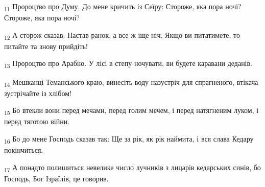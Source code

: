 \begin{tcolorbox}
\textsubscript{11} Пророцтво про Думу. До мене кричить із Сеїру: Стороже, яка пора ночі? Стороже, яка пора ночі?
\end{tcolorbox}
\begin{tcolorbox}
\textsubscript{12} А сторож сказав: Настав ранок, а все ж іще ніч. Якщо ви питатимете, то питайте та знову прийдіть!
\end{tcolorbox}
\begin{tcolorbox}
\textsubscript{13} Пророцтво про Арабію. У лісі в степу ночувати, ви будете каравани деданів.
\end{tcolorbox}
\begin{tcolorbox}
\textsubscript{14} Мешканці Теманського краю, винесіть воду назустріч для спрагненого, втікача зустрічайте із хлібом!
\end{tcolorbox}
\begin{tcolorbox}
\textsubscript{15} Бо втекли вони перед мечами, перед голим мечем, і перед натягненим луком, і перед тяготою війни.
\end{tcolorbox}
\begin{tcolorbox}
\textsubscript{16} Бо до мене Господь сказав так: Ще за рік, як рік наймита, і вся слава Кедару покінчиться.
\end{tcolorbox}
\begin{tcolorbox}
\textsubscript{17} А понадто полишиться невелике число лучників з лицарів кедарських синів, бо Господь, Бог Ізраїлів, це говорив.
\end{tcolorbox}
